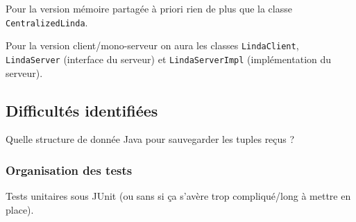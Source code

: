\documentclass[headings=standardclasses,parskip=half]{scrartcl}
\begin{document}
Pour la version mémoire partagée à priori rien de plus que la classe \texttt{CentralizedLinda}.

Pour la version client/mono-serveur on aura les classes \texttt{LindaClient},
\texttt{LindaServer} (interface du serveur) et \texttt{LindaServerImpl} (implémentation du serveur).

\subsection*{Difficultés identifiées}

Quelle structure de donnée Java pour sauvegarder les tuples reçus ?

\subsubsection*{Organisation des tests}

Tests unitaires sous JUnit (ou sans si ça s'avère trop compliqué/long à mettre en place).
\end{document}
